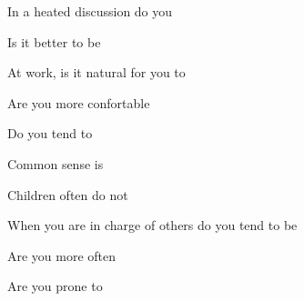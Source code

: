 \documentclass[english,pdf,pagemark,stamp,globalid=\candidateID,oneside]{sdaps}
\begin{document}
\begin{questionnaire}
\begin{multicols}{2}
\begin{choicequestion}[2]{In a heated discussion do you}
\end{choicequestion}

\begin{choicequestion}[2]{Is it better to be}
\end{choicequestion}

\begin{choicequestion}[2]{At work, is it natural for you to}
\end{choicequestion}

\begin{choicequestion}[2]{Are you more confortable}
\end{choicequestion}

\begin{choicequestion}[2]{Do you tend to}
\end{choicequestion}

\begin{choicequestion}[2]{Common sense is}
\end{choicequestion}

\begin{choicequestion}[2]{Children often do not}
\end{choicequestion}

\begin{choicequestion}[2]{When you are in charge of others do you tend to be}
\end{choicequestion}

\begin{choicequestion}[2]{Are you more often}
\end{choicequestion}

\begin{choicequestion}[2]{Are you prone to}
\end{choicequestion}


\end{multicols}
\end{questionnaire}
\end{document}
